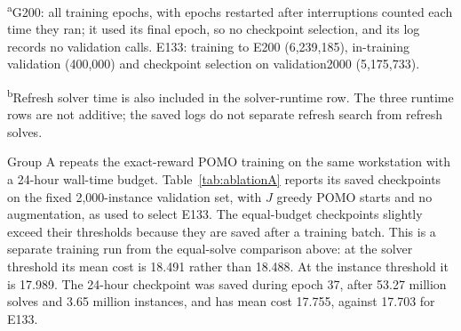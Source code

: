 \documentclass[preprint,12pt,authoryear]{elsarticle}
\begin{document}
\begin{table}[t]
\centering
\caption{Training budgets of G200 and E133.}
\label{tab:budget}
\small
{}
\par\smallskip\footnotesize\raggedright \textsuperscript{a}G200: all training epochs, with epochs restarted after interruptions counted each time they ran; it used its final epoch, so no checkpoint selection, and its log records no validation calls. E133: training to E200 (6,239,185), in-training validation (400,000) and checkpoint selection on validation2000 (5,175,733).
\par \textsuperscript{b}Refresh solver time is also included in the solver-runtime row. The three runtime rows are not additive; the saved logs do not separate refresh search from refresh solves.
\end{table}

Group A repeats the exact-reward POMO training on the same workstation with a 24-hour wall-time budget. Table~\ref{tab:ablationA} reports its saved checkpoints on the fixed 2,000-instance validation set, with $J$ greedy POMO starts and no augmentation, as used to select E133. The equal-budget checkpoints slightly exceed their thresholds because they are saved after a training batch. This is a separate training run from the equal-solve comparison above: at the solver threshold its mean cost is 18.491 rather than 18.488. At the instance threshold it is 17.989. The 24-hour checkpoint was saved during epoch 37, after 53.27 million solves and 3.65 million instances, and has mean cost 17.755, against 17.703 for E133.
\end{document}
